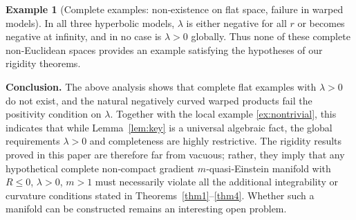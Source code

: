 \documentclass[12pt,a4paper]{article}
\theoremstyle{definition}
\newtheorem{example}[theorem]{Example}
\theoremstyle{definition}
\begin{document}
\begin{example}[Complete examples: non‑existence on flat space, failure in warped models]
In all three hyperbolic models, $\lambda$ is either negative for all $r$ or becomes negative at infinity, and in no case is $\lambda>0$ globally.
Thus none of these complete non‑Euclidean spaces provides an example satisfying the hypotheses of our rigidity theorems.

\medskip
\noindent\textbf{Conclusion.}
The above analysis shows that complete flat examples with $\lambda>0$ do not exist, and the natural negatively curved warped products fail the positivity condition on $\lambda$.
Together with the local example \ref{ex:nontrivial}, this indicates that while Lemma~\ref{lem:key} is a universal algebraic fact, the global requirements $\lambda>0$ and completeness are highly restrictive.
The rigidity results proved in this paper are therefore far from vacuous; rather, they imply that any hypothetical complete non‑compact gradient $m$‑quasi‑Einstein manifold with $R\le 0$, $\lambda>0$, $m>1$ must necessarily violate all the additional integrability or curvature conditions stated in Theorems~\ref{thm1}--\ref{thm4}.
Whether such a manifold can be constructed remains an interesting open problem.
\end{example}
\end{document}
